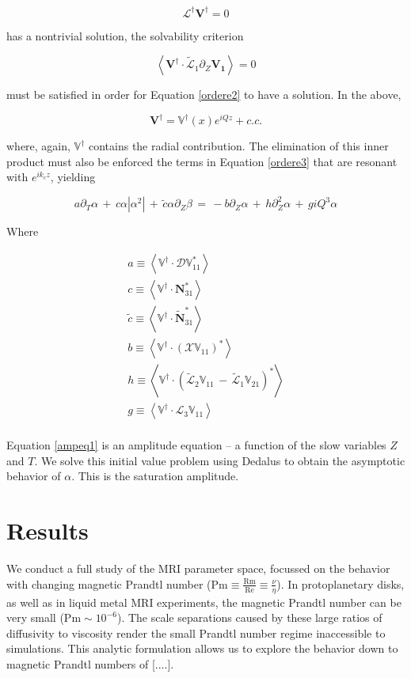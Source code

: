 \documentclass{emulateapj}
\newcommand{\beq}{\begin{equation}}
\newcommand{\eeq}{\end{equation}}
\begin{document}
\beq
\mathcal{L}^\dagger \mathbf{V}^\dagger = 0
\eeq

has a nontrivial solution, the solvability criterion

\beq
\left< \mathbf{V}^\dagger \cdot \widetilde{\mathcal{L}}_1 \partial_Z \mathbf{V_1}\right> = 0 
\eeq

must be satisfied in order for Equation \ref{ordere2} to have a solution. In the above, 

\beq
\mathbf{V}^\dagger = \mathbb{V}^\dagger(x) e^{iQz} + c.c.
\eeq

where, again, $\mathbb{V}^\dagger$ contains the radial contribution. The elimination of this inner product must also be enforced the terms in Equation \ref{ordere3} that are resonant with $e^{i k_c z}$, yielding

\beq
\label{ampeq1}
a \partial_T \alpha \, + \, c \alpha \left|\alpha^2\right| \, + \, \widetilde{c} \alpha \partial_Z \beta \, = \, - b \partial_Z \alpha \, + \, h \partial_Z^2 \alpha \, + \, g i Q^3 \alpha
\eeq

Where

\begin{multline}
a \equiv \left< \mathbb{V}^\dagger \cdot \mathcal{D}\mathbb{V}^*_{11}\right> \\
c \equiv \left< \mathbb{V}^\dagger \cdot \mathbf{N}^*_{31}\right> \\
\widetilde{c} \equiv \left< \mathbb{V}^\dagger \cdot \widetilde{\mathbf{N}}^*_{31}\right> \\
b \equiv \left< \mathbb{V}^\dagger \cdot \left(\mathcal{X}\mathbb{V}_{11}\right)^* \right> \\
h \equiv \left< \mathbb{V}^\dagger \cdot \left(\widetilde{\mathcal{L}}_2\mathbb{V}_{11} \, - \, \widetilde{\mathcal{L}}_1\mathbb{V}_{21} \right)^* \right> \\
g \equiv \left< \mathbb{V}^\dagger \cdot \mathcal{L}_{3} \mathbb{V}_{11} \right> \\
\end{multline}

Equation \ref{ampeq1} is an amplitude equation -- a function of the slow variables $Z$ and $T$. We solve this initial value problem using Dedalus to obtain the asymptotic behavior of $\alpha$. This is the saturation amplitude.

\section{Results}

We conduct a full study of the MRI parameter space, focussed on the behavior with changing magnetic Prandtl number ($\mathrm{Pm} \equiv \frac{\mathrm{Rm}}{\mathrm{Re}} \equiv \frac{\nu}{\eta}$). In protoplanetary disks, as well as in liquid metal MRI experiments, the magnetic Prandtl number can be very small ($\mathrm{Pm} \sim 10^{-6}$). The scale separations caused by these large ratios of diffusivity to viscosity render the small Prandtl number regime inaccessible to simulations. This analytic formulation allows us to explore the behavior down to magnetic Prandtl numbers of [....].
\end{document}
